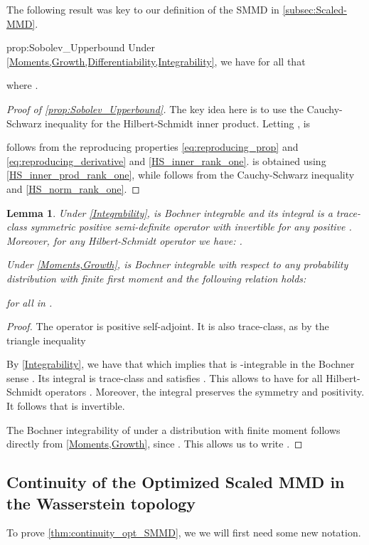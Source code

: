 \documentclass{article}
\newtheorem{lem}{Lemma}
\begin{document}
The following result was key to our definition of the SMMD in \cref{subsec:Scaled-MMD}.
\begin{repprop}{prop:Sobolev_Upperbound}
  Under \cref{Moments,Growth,Differentiability,Integrability},
  we have for all  that
  
  where
  .
\end{repprop}
\begin{proof}[Proof of \cref{prop:Sobolev_Upperbound}]
\label{proof:Sobolev_Upperbound}
The key idea here is to use the Cauchy-Schwarz inequality for the Hilbert-Schmidt inner product.
Letting ,
 is

 follows from the reproducing properties \eqref{eq:reproducing_prop}
and \eqref{eq:reproducing_derivative} and \cref{HS_inner_rank_one}.
 is obtained using \cref{HS_inner_prod_rank_one},
while  follows from the Cauchy-Schwarz inequality and \cref{HS_norm_rank_one}.
\end{proof}
\begin{lem}
\label{lem:Bochner_interversion}Under \cref{Integrability}, 
is Bochner integrable and its integral  is a trace-class symmetric
positive semi-definite operator with  invertible
for any positive . Moreover, for any Hilbert-Schmidt operator
 we have: .

Under \cref{Moments,Growth},  is Bochner integrable with
respect to any probability distribution  with finite first moment
and the following relation holds:

for all  in .
\end{lem}
\begin{proof}
The operator  is positive self-adjoint.
It is also trace-class,
as by the triangle inequality

By \cref{Integrability},
we have that 
which implies that  is -integrable in the Bochner sense
\parencite[Definition 1 and Theorem 2]{Retherford:1978}. Its integral  is trace-class and satisfies
.  This allows to have  for all Hilbert-Schmidt operators . Moreover, the integral preserves the symmetry and positivity. It follows that  is invertible.

The Bochner integrability of  under a distribution  with finite moment follows directly from \cref{Moments,Growth}, since . This allows us to write .
\end{proof}


\subsection{Continuity of the Optimized Scaled MMD in the Wasserstein topology}\label{appendix:continuity_opt_smmd}
To prove \cref{thm:continuity_opt_SMMD},
we we will first need some new notation.
\end{document}
